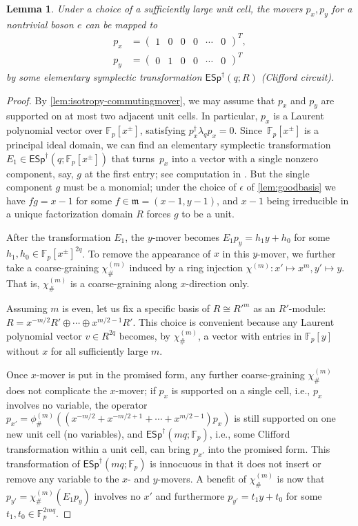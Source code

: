 \documentclass[aps,pra,
floatfix,notitlepage,
nofootinbib,
longbibliography,11pt]{revtex4-1}
\newtheorem{lemma}{Lemma}[section]
\theoremstyle{definition}
\newcommand{\FF}{{\mathbb{F}}}
\newcommand{\cg}[1]{{\phi_\#^{({#1})}}}
\newcommand{\cgx}[1]{{\chi_\#^{({#1})}}}
\newcommand{\mm}{\mathfrak{m}}
\newcommand{\ESp}{{\mathsf{ESp}^\dagger}}
\begin{document}
\begin{lemma}\label{lem:commutingmover=trivialmover}
Under a choice of a sufficiently large unit cell,
the movers $p_x,p_y$ for a nontrivial boson $e$ can be mapped to
\begin{align}
p_x &= \begin{pmatrix} 1 & 0 & 0 & 0 &\cdots & 0\end{pmatrix}^T, \nonumber\\
p_y &= \begin{pmatrix} 0 & 1 & 0 & 0 & \cdots & 0 \end{pmatrix}^T
\end{align}
by some elementary symplectic transformation $\ESp(q;R)$ (Clifford circuit).
\end{lemma}
\begin{proof}
By \cref{lem:isotropy-commutingmover},
we may assume that $p_x$ and $p_y$ are supported on at most two adjacent unit cells.
In particular, $p_x$ is a Laurent polynomial vector over $\FF_p[x^\pm]$,
satisfying $p_x^\dagger \lambda_q p_x = 0$.
Since~$\FF_p[x^\pm]$ is a principal ideal domain,
we can find an elementary symplectic transformation $E_1 \in \ESp(q;\FF_p[x^\pm])$ 
that turns~$p_x$ into a vector with a single nonzero component, say, $g$ at the first entry;
see computation in \cite[\S 6]{Haah2013}.
But the single component $g$ must be a monomial;
under the choice of $\epsilon$ of \cref{lem:goodbasis} 
we have $fg=x-1$ for some $f \in \mm = (x-1,y-1)$,
and $x-1$ being irreducible in a unique factorization domain $R$
forces $g$ to be a unit.

After the transformation $E_1$,
the $y$-mover becomes $E_1 p_y = h_1 y + h_0$ for some $h_1,h_0 \in \FF_p[x^\pm]^{2q}$.
To remove the appearance of $x$ in this $y$-mover,
we further take a coarse-graining $\cgx{m}$ induced by a ring injection 
$\chi^{(m)} : x' \mapsto x^m, y' \mapsto y$.
That is, $\cgx{m}$ is a coarse-graining along $x$-direction only.

Assuming $m$ is even, 
let us fix a specific basis of $R \cong R'^{m}$ as an $R'$-module:
$R = x^{-m/2}R' \oplus \cdots \oplus x^{m/2-1}R'$.
This choice is convenient because any Laurent polynomial vector $v \in R^{2q}$
becomes, by $\cgx{m}$, a vector with entries in $\FF_p[y]$ without $x$
for all sufficiently large $m$.

Once $x$-mover is put in the promised form,
any further coarse-graining $\cgx{m}$ does not complicate the $x$-mover;
if $p_x$ is supported on a single cell, i.e., $p_x$ involves no variable,
the operator $p_{x'} = \cg{m}((x^{-m/2}+x^{-m/2+1}+\cdots+ x^{m/2-1})p_x)$ 
is still supported on one new unit cell (no variables),
and $\ESp(mq;\FF_p)$, i.e., some Clifford transformation within a unit cell,
can bring $p_{x'}$ into the promised form.
This transformation of $\ESp(mq;\FF_p)$ is innocuous in that 
it does not insert or remove any variable to the $x$- and $y$-movers.
A benefit of $\cgx{m}$ is now that 
$p_{y'} = \cgx{m}(E_1 p_y)$ 
involves no $x'$ and furthermore $p_{y'} = t_1 y + t_0$ for some $t_1,t_0 \in \FF_p^{2mq}$.


\end{proof}
\end{document}
